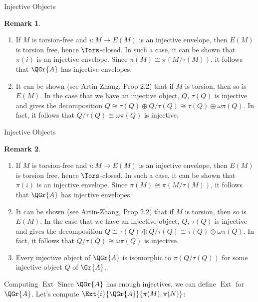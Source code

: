 \documentclass{beamer}
\theoremstyle{definition}
\newtheorem{rmk}{Remark}
\begin{document}
\begin{frame}{Injective Objects}
  \setcounter{rmk}{1}
  \begin{rmk}
    \begin{enumerate}
    \item
      If $M$ is torsion-free and $i \colon M \rightarrow E(M)$ is an injective envelope, then $E(M)$ is torsion free, hence $\Tors$-closed.
      In such a case, it can be shown that $\pi(i)$ is an injective envelope.
      Since $\pi(M) \cong \pi(M/\tau(M))$, it follows that $\QGr{A}$ has injective envelopes.
    \item
      It can be shown (see Artin-Zhang, Prop 2.2) that if $M$ is torsion, then so is $E(M)$.
      In the case that we have an injective object, $Q$, $\tau(Q)$ is injective and gives the decomposition $Q \cong \tau(Q) \oplus Q/\tau(Q) \cong \tau(Q) \oplus \omega\pi(Q)$.
      In fact, it follows that $Q/\tau(Q) \cong \omega\pi(Q)$ is injective.
    \end{enumerate}
  \end{rmk}
\end{frame}

\begin{frame}{Injective Objects}
  \setcounter{rmk}{1}
  \begin{rmk}
    \begin{enumerate}
    \item
      If $M$ is torsion-free and $i \colon M \rightarrow E(M)$ is an injective envelope, then $E(M)$ is torsion free, hence $\Tors$-closed.
      In such a case, it can be shown that $\pi(i)$ is an injective envelope.
      Since $\pi(M) \cong \pi(M/\tau(M))$, it follows that $\QGr{A}$ has injective envelopes.
    \item
      It can be shown (see Artin-Zhang, Prop 2.2) that if $M$ is torsion, then so is $E(M)$.
      In the case that we have an injective object, $Q$, $\tau(Q)$ is injective and gives the decomposition $Q \cong \tau(Q) \oplus Q/\tau(Q) \cong \tau(Q) \oplus \omega\pi(Q)$.
      In fact, it follows that $Q/\tau(Q) \cong \omega\pi(Q)$ is injective.
    \item
      Every injective object of $\QGr{A}$ is isomorphic to $\pi(Q/\tau(Q))$ for some injective object $Q$ of $\Gr{A}$.
    \end{enumerate}
  \end{rmk}
\end{frame}

\begin{frame}{Computing $\operatorname{Ext}$}
  Since $\QGr{A}$ has enough injectives, we can define $\operatorname{Ext}$ for $\QGr{A}$.
  Let's compute $\Ext{i}{\QGr{A}}{\pi(M), \pi(N)}$:
\end{frame}
\end{document}
